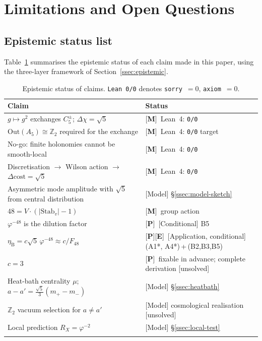 \documentclass[sn-mathphys-num,Numbered]{sn-jnl}
\theoremstyle{thmstyleone}
\theoremstyle{thmstylethree}
\theoremstyle{thmstyletwo}
\newcommand{\etaB}{\eta_{\mathrm{B}}}
\newcommand{\tagM}{[\textbf{M}]}
\newcommand{\tagP}{[\textbf{P}]}
\newcommand{\tagE}{[\textbf{E}]}
\begin{document}
\section{Limitations and Open Questions}
\label{sec:limitations}

\subsection{Epistemic status list}
\label{ssec:epistemic-status}

Table~\ref{tab:epistemic} summarises the epistemic status of each
claim made in this paper, using the three-layer framework of
Section~\ref{ssec:epistemic}.

\begin{table}[h]
\caption{Epistemic status of claims. \texttt{Lean~0/0} denotes
\texttt{sorry}~$=0$, \texttt{axiom}~$=0$.}
\label{tab:epistemic}
\begin{tabular}{@{}p{6.5cm}p{5.5cm}@{}}
\toprule
Claim & Status \\
\midrule
$g\mapsto g^2$ exchanges $C_5^\pm$; $\Delta\chi=\sqrt{5}$ &
  \tagM\ Lean~4: \texttt{0/0} \\[2pt]
$\mathrm{Out}(A_5)\cong\mathbb{Z}_2$ required for the exchange &
  \tagM\ Lean~4: \texttt{0/0} target \\[2pt]
No-go: finite holonomies cannot be smooth-local &
  \tagM\ Lean~4: \texttt{0/0} \\[2pt]
Discretisation $\to$ Wilson action $\to$ $\Delta\mathrm{cost}=\sqrt{5}$ &
  \tagM\ Lean~4: \texttt{0/0} \\[2pt]
Asymmetric mode amplitude with $\sqrt{5}$ from central distribution &
  [Model] \S\ref{ssec:model-sketch} \\[2pt]
$48 = V\cdot(|\mathrm{Stab}_v|-1)$ &
  \tagM\ group action \\[2pt]
$\varphi^{-48}$ is the dilution factor &
  \tagP\ [Conditional] B5 \\[2pt]
$\etaB = c\sqrt{5}\,\varphi^{-48}\approx c/F_{48}$ &
  \tagP\tagE\ [Application, conditional] (A1*, A4*)\,+\,(B2,B3,B5) \\[2pt]
$c=3$ &
  \tagP\ fixable in advance; complete derivation [unsolved] \\[2pt]
Heat-bath centrality $\mu$; $a-a'=\tfrac{\sqrt{5}}{3}(m_+-m_-)$ &
  [Model] \S\ref{ssec:heatbath} \\[2pt]
$\mathbb{Z}_2$ vacuum selection for $a\neq a'$ &
  [Model] cosmological realisation [unsolved] \\[2pt]
Local prediction $R_X=\varphi^{-2}$ &
  [Model] \S\ref{ssec:local-test} \\
\botrule
\end{tabular}
\end{table}
\end{document}
